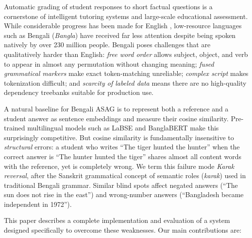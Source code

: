 \documentclass[11pt]{article}
\begin{document}
Automatic grading of student responses to short factual questions is a cornerstone of intelligent tutoring systems and large-scale educational assessment. While considerable progress has been made for English \citep{mohler2011learning, sultan2016fast, riordan2017investigating}, low-resource languages such as Bengali (\emph{Bangla}) have received far less attention despite being spoken natively by over 230 million people. Bengali poses challenges that are qualitatively harder than English: \emph{free word order} allows subject, object, and verb to appear in almost any permutation without changing meaning; \emph{fused grammatical markers} make exact token-matching unreliable; \emph{complex script} makes tokenization difficult; and \emph{scarcity of labeled data} means there are no high-quality dependency treebanks suitable for production use.

A natural baseline for Bengali ASAG is to represent both a reference and a student answer as sentence embeddings and measure their cosine similarity. Pre-trained multilingual models such as LaBSE \citep{feng2022labse} and BanglaBERT \citep{bhattacharjee-etal-2022-banglabert} make this surprisingly competitive. But cosine similarity is fundamentally insensitive to \emph{structural} errors: a student who writes ``The tiger hunted the hunter'' when the correct answer is ``The hunter hunted the tiger'' shares almost all content words with the reference, yet is completely wrong. We term this failure mode \emph{Karak reversal}, after the Sanskrit grammatical concept of semantic roles (\emph{karak}) used in traditional Bengali grammar. Similar blind spots affect negated answers (``The sun does not rise in the east'') and wrong-number answers (``Bangladesh became independent in 1972'').

This paper describes a complete implementation and evaluation of a system designed specifically to overcome these weaknesses. Our main contributions are:
\end{document}
